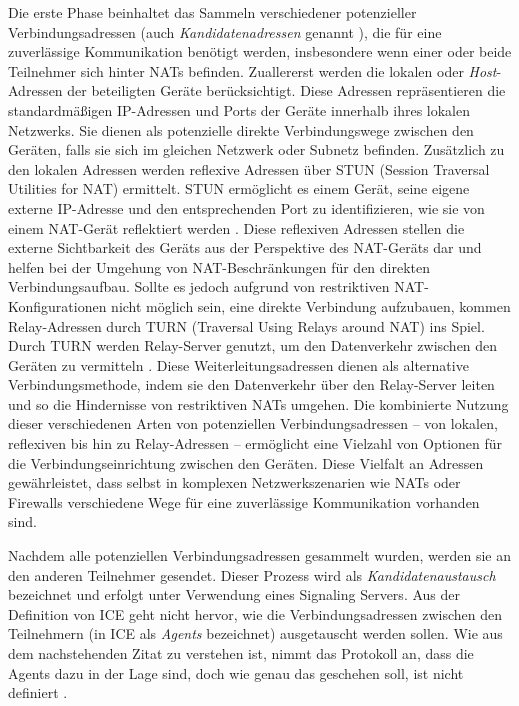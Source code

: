 Die erste Phase beinhaltet das Sammeln verschiedener potenzieller Verbindungsadressen (auch \textit{Kandidatenadressen} genannt \parencite[S. 8]{rfc8445_ICE}), die für eine zuverlässige Kommunikation benötigt werden, insbesondere wenn einer oder beide Teilnehmer sich hinter NATs befinden. Zuallererst werden die lokalen oder \textit{Host}-Adressen der beteiligten Geräte berücksichtigt. Diese Adressen repräsentieren die standardmäßigen IP-Adressen und Ports der Geräte innerhalb ihres lokalen Netzwerks. Sie dienen als potenzielle direkte Verbindungswege zwischen den Geräten, falls sie sich im gleichen Netzwerk oder Subnetz befinden.
Zusätzlich zu den lokalen Adressen werden reflexive Adressen über STUN (Session Traversal Utilities for NAT) ermittelt. STUN ermöglicht es einem Gerät, seine eigene externe IP-Adresse und den entsprechenden Port zu identifizieren, wie sie von einem NAT-Gerät reflektiert werden \parencite[S. 4]{rfc8489_STUN}. Diese reflexiven Adressen stellen die externe Sichtbarkeit des Geräts aus der Perspektive des NAT-Geräts dar und helfen bei der Umgehung von NAT-Beschränkungen für den direkten Verbindungsaufbau. Sollte es jedoch aufgrund von restriktiven NAT-Konfigurationen nicht möglich sein, eine direkte Verbindung aufzubauen, kommen Relay-Adressen durch TURN (Traversal Using Relays around NAT) ins Spiel.
Durch TURN werden Relay-Server genutzt, um den Datenverkehr zwischen den Geräten zu vermitteln \parencite[S. 10-11]{rfc8656_TURN}. Diese Weiterleitungsadressen dienen als alternative Verbindungsmethode, indem sie den Datenverkehr über den Relay-Server leiten und so die Hindernisse von restriktiven NATs umgehen.
Die kombinierte Nutzung dieser verschiedenen Arten von potenziellen Verbindungsadressen – von lokalen, reflexiven bis hin zu Relay-Adressen – ermöglicht eine Vielzahl von Optionen für die Verbindungseinrichtung zwischen den Geräten. Diese Vielfalt an Adressen gewährleistet, dass selbst in komplexen Netzwerkszenarien wie NATs oder Firewalls verschiedene Wege für eine zuverlässige Kommunikation vorhanden sind.

Nachdem alle potenziellen Verbindungsadressen gesammelt wurden, werden sie an den anderen Teilnehmer gesendet. Dieser Prozess wird als \textit{Kandidatenaustausch} bezeichnet und erfolgt unter Verwendung eines Signaling Servers. Aus der Definition von ICE geht nicht hervor, wie die Verbindungsadressen zwischen den Teilnehmern (in ICE als \textit{Agents} bezeichnet) ausgetauscht werden sollen. Wie aus dem nachstehenden Zitat zu verstehen ist, nimmt das Protokoll an, dass die Agents dazu in der Lage sind, doch wie genau das geschehen soll, ist nicht definiert \Parencite{rfc8445_ICE}.

